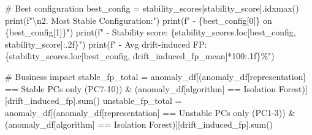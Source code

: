 \documentclass[
  letterpaper,
  DIV=11,
  numbers=noendperiod]{scrartcl}
\newenvironment{Shaded}{\begin{snugshade}}{\end{snugshade}}
\newcommand{\BuiltInTok}[1]{\textcolor[rgb]{0.00,0.23,0.31}{#1}}
\newcommand{\CharTok}[1]{\textcolor[rgb]{0.13,0.47,0.30}{#1}}
\newcommand{\CommentTok}[1]{\textcolor[rgb]{0.37,0.37,0.37}{#1}}
\newcommand{\DecValTok}[1]{\textcolor[rgb]{0.68,0.00,0.00}{#1}}
\newcommand{\NormalTok}[1]{\textcolor[rgb]{0.00,0.23,0.31}{#1}}
\newcommand{\OperatorTok}[1]{\textcolor[rgb]{0.37,0.37,0.37}{#1}}
\newcommand{\SpecialCharTok}[1]{\textcolor[rgb]{0.37,0.37,0.37}{#1}}
\newcommand{\SpecialStringTok}[1]{\textcolor[rgb]{0.13,0.47,0.30}{#1}}
\newcommand{\StringTok}[1]{\textcolor[rgb]{0.13,0.47,0.30}{#1}}
\renewenvironment{Shaded}{%
  \begin{tcolorbox}[%
    enhanced,%
    colback=codebg,%
    colframe=codebg,%
    borderline west={3pt}{0pt}{sectionblue},%
    fontupper=\small\ttfamily,%
    boxrule=0pt,%
    arc=0pt,%
    boxsep=5pt,%
    left=2mm,%
    right=2mm,%
    top=2mm,%
    bottom=2mm%
  ]%
}{%
  \end{tcolorbox}%
}
\begin{document}
\begin{Shaded}
\begin{Highlighting}[]
\CommentTok{\# Best configuration}
\NormalTok{best\_config }\OperatorTok{=}\NormalTok{ stability\_scores[}\StringTok{\textquotesingle{}stability\_score\textquotesingle{}}\NormalTok{].idxmax()}
\BuiltInTok{print}\NormalTok{(}\SpecialStringTok{f"}\CharTok{\textbackslash{}n}\SpecialStringTok{2. Most Stable Configuration:"}\NormalTok{)}
\BuiltInTok{print}\NormalTok{(}\SpecialStringTok{f"   {-} }\SpecialCharTok{\{}\NormalTok{best\_config[}\DecValTok{0}\NormalTok{]}\SpecialCharTok{\}}\SpecialStringTok{ on }\SpecialCharTok{\{}\NormalTok{best\_config[}\DecValTok{1}\NormalTok{]}\SpecialCharTok{\}}\SpecialStringTok{"}\NormalTok{)}
\BuiltInTok{print}\NormalTok{(}\SpecialStringTok{f"   {-} Stability score: }\SpecialCharTok{\{}\NormalTok{stability\_scores}\SpecialCharTok{.}\NormalTok{loc[best\_config, }\StringTok{\textquotesingle{}stability\_score\textquotesingle{}}\NormalTok{]}\SpecialCharTok{:.2f\}}\SpecialStringTok{"}\NormalTok{)}
\BuiltInTok{print}\NormalTok{(}\SpecialStringTok{f"   {-} Avg drift{-}induced FP: }\SpecialCharTok{\{}\NormalTok{stability\_scores}\SpecialCharTok{.}\NormalTok{loc[best\_config, }\StringTok{\textquotesingle{}drift\_induced\_fp\_mean\textquotesingle{}}\NormalTok{]}\OperatorTok{*}\DecValTok{100}\SpecialCharTok{:.1f\}}\SpecialStringTok{\%"}\NormalTok{)}

\CommentTok{\# Business impact}
\NormalTok{stable\_fp\_total }\OperatorTok{=}\NormalTok{ anomaly\_df[(anomaly\_df[}\StringTok{\textquotesingle{}representation\textquotesingle{}}\NormalTok{] }\OperatorTok{==} \StringTok{\textquotesingle{}Stable PCs only (PC7{-}10)\textquotesingle{}}\NormalTok{) }\OperatorTok{\&} 
\NormalTok{                             (anomaly\_df[}\StringTok{\textquotesingle{}algorithm\textquotesingle{}}\NormalTok{] }\OperatorTok{==} \StringTok{\textquotesingle{}Isolation Forest\textquotesingle{}}\NormalTok{)][}\StringTok{\textquotesingle{}drift\_induced\_fp\textquotesingle{}}\NormalTok{].}\BuiltInTok{sum}\NormalTok{()}
\NormalTok{unstable\_fp\_total }\OperatorTok{=}\NormalTok{ anomaly\_df[(anomaly\_df[}\StringTok{\textquotesingle{}representation\textquotesingle{}}\NormalTok{] }\OperatorTok{==} \StringTok{\textquotesingle{}Unstable PCs only (PC1{-}3)\textquotesingle{}}\NormalTok{) }\OperatorTok{\&} 
\NormalTok{                               (anomaly\_df[}\StringTok{\textquotesingle{}algorithm\textquotesingle{}}\NormalTok{] }\OperatorTok{==} \StringTok{\textquotesingle{}Isolation Forest\textquotesingle{}}\NormalTok{)][}\StringTok{\textquotesingle{}drift\_induced\_fp\textquotesingle{}}\NormalTok{].}\BuiltInTok{sum}\NormalTok{()}


\end{Highlighting}
\end{Shaded}
\end{document}
